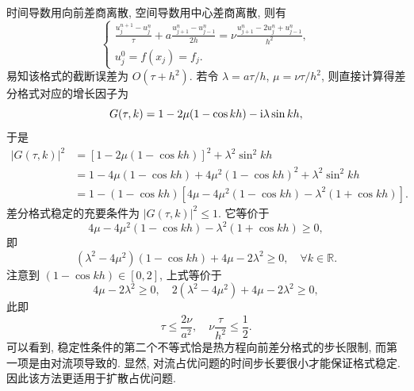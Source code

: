 时间导数用向前差商离散, 空间导数用中心差商离散, 则有
\begin{equation}\label{eq:convection-diffusion-center}
    \begin{cases}
        \frac{u_j^{n+1} - u_j^n}{\tau} + a \frac{u_{j+1}^n - u_{j-1}^n}{2h} = \nu\frac{u_{j+1}^n - 2u_j^n + u_{j-1}^n}{h^2}, \\
        u_j^0 = f(x_j) = f_j.
    \end{cases}
\end{equation}
易知该格式的截断误差为 $O(\tau + h^2)$. 若令 $\lambda = a\tau/h$, $\mu = \nu\tau/h^2$, 则直接计算得差分格式对应的增长因子为
\begin{equation*}
    G(\tau, k) = 1 - 2\mu(1 - \cos kh) - \mathrm{i}\lambda \sin kh,
\end{equation*}
于是
\begin{align*}
    |G(\tau, k)|^2 &= [1 - 2\mu(1 - \cos kh)]^2 + \lambda^2\sin^2 kh \\
    &= 1 - 4\mu(1 - \cos kh) + 4\mu^2(1 - \cos kh)^2 + \lambda^2\sin^2 kh \\
    &= 1 - (1 - \cos kh) \left[ 4\mu - 4\mu^2(1 - \cos kh) - \lambda^2(1 + \cos kh) \right].
\end{align*}
差分格式稳定的充要条件为 $|G(\tau, k)|^2 \leq 1$. 它等价于
\begin{equation*}
    4\mu - 4\mu^2(1 - \cos kh) - \lambda^2(1 + \cos kh) \geq 0,
\end{equation*}
即
\begin{equation*}
    (\lambda^2 - 4\mu^2)(1 - \cos kh) + 4\mu - 2\lambda^2 \geq 0, \quad \forall k \in \mathbb{R}.
\end{equation*}
注意到 $(1 - \cos kh) \in [0, 2]$, 上式等价于
\begin{equation*}
    4\mu - 2\lambda^2 \geq 0, \quad 2(\lambda^2 - 4\mu^2) + 4\mu - 2\lambda^2 \geq 0,
\end{equation*}
此即
\begin{equation}\label{eq:convection-diffusion-center-stability}
    \tau \leq \frac{2\nu}{a^2}, \quad \nu\frac{\tau}{h^2} \leq \frac{1}{2}.
\end{equation}
可以看到, 稳定性条件的第二个不等式恰是热方程向前差分格式的步长限制, 而第一项是由对流项导致的. 显然, 对流占优问题的时间步长要很小才能保证格式稳定.因此该方法更适用于扩散占优问题.

